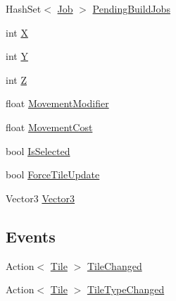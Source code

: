\begin{DoxyCompactItemize}
Hash\+Set$<$ \hyperlink{class_job}{Job} $>$ \hyperlink{class_tile_aa23e1ff55199851f33739caee50495fc}{Pending\+Build\+Jobs}
\item 
int \hyperlink{class_tile_a9cf9a09c5a83a5789b3302b2cd888552}{X}
\item 
int \hyperlink{class_tile_aaa6f10c5c75614c1c855a9e5be97acd0}{Y}
\item 
int \hyperlink{class_tile_a8f051217146f35f8df3f110a5408b7fe}{Z}
\item 
float \hyperlink{class_tile_abb2003a763a47e688f96edf88633ace7}{Movement\+Modifier}
\item 
float \hyperlink{class_tile_a0711fb028d7d558334c3bc57ebd49e80}{Movement\+Cost}
\item 
bool \hyperlink{class_tile_a29b80ed6a151b7613b9e903d046bdb1e}{Is\+Selected}
\item 
bool \hyperlink{class_tile_a6efbaf733ba89b602e3293d78840d8e8}{Force\+Tile\+Update}
\item 
Vector3 \hyperlink{class_tile_a195ab8d54782b43fb51c55c833bfe7e1}{Vector3}
\end{DoxyCompactItemize}
\subsection*{Events}
\begin{DoxyCompactItemize}
\item 
Action$<$ \hyperlink{class_tile}{Tile} $>$ \hyperlink{class_tile_a95594f2dd7d805875b81820e19f25247}{Tile\+Changed}
\item 
Action$<$ \hyperlink{class_tile}{Tile} $>$ \hyperlink{class_tile_a73162fe19ec1295f61ad29b0fbb1a049}{Tile\+Type\+Changed}
\end{DoxyCompactItemize}


